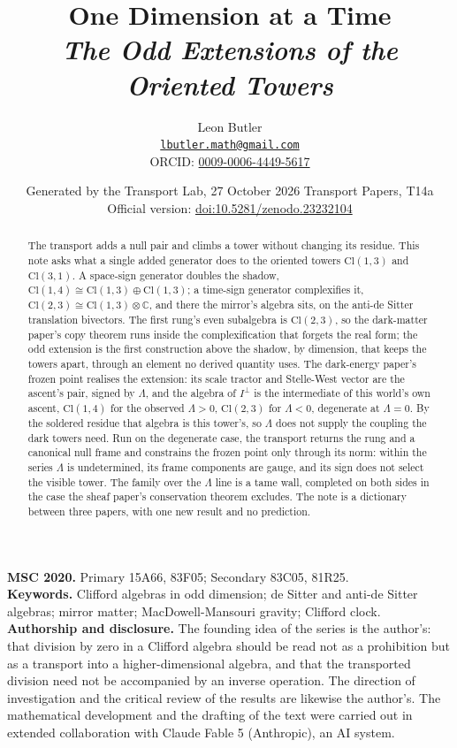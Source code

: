 \documentclass[11pt]{article}
\title{\bfseries One Dimension at a Time\\[4pt]\large\itshape The Odd Extensions of the Oriented Towers}
\author{Leon Butler\\ \normalsize\href{mailto:lbutler.math@gmail.com}{\texttt{lbutler.math@gmail.com}}\\ \normalsize ORCID: \href{https://orcid.org/0009-0006-4449-5617}{0009-0006-4449-5617}}
\date{Generated by the Transport Lab, 27 October 2026 \textperiodcentered{} Transport Papers, T14a\\[3pt]\small Official version: \href{https://doi.org/10.5281/zenodo.23232104}{doi:10.5281/zenodo.23232104}}
\theoremstyle{definition}
\theoremstyle{plain}
\providecommand{\C}{}\renewcommand{\C}{\mathbb{C}}
\providecommand{\Cl}{}\renewcommand{\Cl}{\mathrm{Cl}}
\begin{document}
\maketitle
\begin{abstract}
\normalsize
The transport adds a null pair and climbs a tower without changing its residue. This note asks what a single added generator does to the oriented towers $\Cl(1,3)$ and $\Cl(3,1)$. A space-sign generator doubles the shadow, $\Cl(1,4) \cong \Cl(1,3) \oplus \Cl(1,3)$; a time-sign generator complexifies it, $\Cl(2,3) \cong \Cl(1,3) \otimes \C$, and there the mirror's algebra sits, on the anti-de Sitter translation bivectors. The first rung's even subalgebra is $\Cl(2,3)$, so the dark-matter paper's copy theorem runs inside the complexification that forgets the real form; the odd extension is the first construction above the shadow, by dimension, that keeps the towers apart, through an element no derived quantity uses. The dark-energy paper's frozen point realises the extension: its scale tractor and Stelle-West vector are the ascent's pair, signed by $\Lambda$, and the algebra of $I^{\perp}$ is the intermediate of this world's own ascent, $\Cl(1,4)$ for the observed $\Lambda > 0$, $\Cl(2,3)$ for $\Lambda < 0$, degenerate at $\Lambda = 0$. By the soldered residue that algebra is this tower's, so $\Lambda$ does not supply the coupling the dark towers need. Run on the degenerate case, the transport returns the rung and a canonical null frame and constrains the frozen point only through its norm: within the series $\Lambda$ is undetermined, its frame components are gauge, and its sign does not select the visible tower. The family over the $\Lambda$ line is a tame wall, completed on both sides in the case the sheaf paper's conservation theorem excludes. The note is a dictionary between three papers, with one new result and no prediction.
\end{abstract}
\medskip
\noindent\textbf{MSC 2020.} Primary 15A66, 83F05; Secondary 83C05, 81R25.\\
\textbf{Keywords.} Clifford algebras in odd dimension; de Sitter and anti-de Sitter algebras; mirror matter; MacDowell-Mansouri gravity; Clifford clock.
\newpage
\noindent \textbf{Authorship and disclosure. }The founding idea of the series is the author's: that division by zero in a Clifford algebra should be read not as a prohibition but as a transport into a higher-dimensional algebra, and that the transported division need not be accompanied by an inverse operation. The direction of investigation and the critical review of the results are likewise the author's. The mathematical development and the drafting of the text were carried out in extended collaboration with Claude Fable 5 (Anthropic), an AI system.
\end{document}
